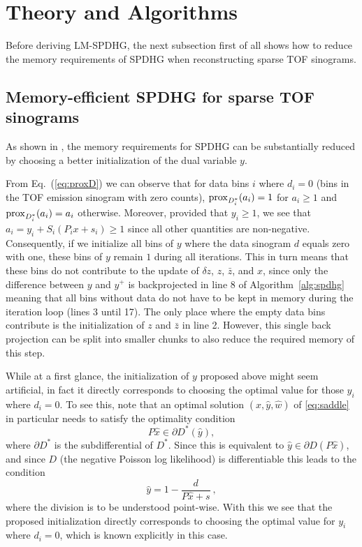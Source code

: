 \section{Theory and Algorithms}

Before deriving LM-SPDHG, the next subsection first of all shows how to reduce the memory 
requirements of SPDHG when reconstructing sparse TOF sinograms. 

\subsection*{Memory-efficient SPDHG for sparse TOF sinograms}

As shown in \cite{Schramm2021}, the memory requirements for SPDHG can be substantially reduced by 
choosing a better initialization of the dual variable $y$.

From Eq.~(\ref{eq:proxD}) we can observe that for data bins $i$ where $d_i = 0$ 
(bins in the TOF emission sinogram with zero counts), 
$\operatorname{prox}_{D_i^*}(a_i) = 1$ for $a_i \geq 1$ and $\operatorname{prox}_{D_i^*}(a_i) = a_i$ 
otherwise. 
Moreover, provided that $y_i \geq 1$, we see that $ a_i = y_i + S_i (P_i x + s_i) \geq 1$ 
since all other quantities are non-negative. 
Consequently, if we initialize all bins of $y$ where the data sinogram $d$ equals zero with one, 
these bins of $y$ remain $1$ during all iterations. 
This in turn means that these bins do not contribute to the update of $\delta z$, $z$, $\bar{z}$, 
and $x$, since only the difference between
$y$ and $y^+$ is backprojected in line 8 of Algorithm~\ref{alg:spdhg} meaning that all
bins without data do not have to be kept in memory during the iteration loop (lines 3 until 17). 
The only place where the empty data bins contribute is the initialization of $z$ and $\bar{z}$
in line 2.
However, this single back projection can be split into smaller chunks to also reduce
the required memory of this step.

While at a first glance, the initialization of $y$ proposed above might seem artificial, in fact it 
directly corresponds to choosing the optimal value for those $y_i$ where $d_i=0$. 
To see this, note that an optimal solution $(\hat{x},\hat{y},\hat{w})$ of \eqref{eq:saddle} in 
particular needs to satisfy the optimality condition
\begin{equation}
P \hat{x} \in  \partial D^*(\hat{y}),
\end{equation}
where $\partial D^*$ is the subdifferential of $D^*$. Since this is equivalent to $\hat{y} \in  \partial D(P \hat{x})$, and since $D$ (the negative Poisson log likelihood) is differentiable this leads 
to the condition
\begin{equation}
\hat{y} = 1 - \frac{d}{P\hat{x} + s} \ ,
\label{eq:yinit}
\end{equation}
where the division is to be understood point-wise. 
With this we see that the proposed initialization directly corresponds to choosing the optimal value 
for $y_i $ where $d_i=0$, which is known explicitly in this case.

